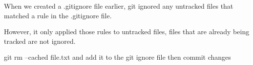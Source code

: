 When we created a .gitignore file earlier, git ignored any untracked files 
that matched a rule in the .gitignore file.

However, it only applied those rules to untracked files, files that are already
being tracked are not ignored. 

git rm --cached file.txt
and add it to the git ignore file 
then commit changes 